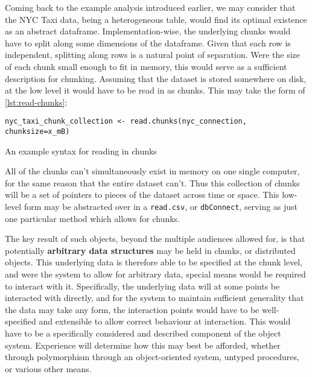 Coming back to the example analysis introduced earlier, we may consider
that the NYC Taxi data, being a heterogeneous table, would find its
optimal existence as an abstract dataframe. Implementation-wise, the
underlying chunks would have to split along some dimensions of the
dataframe. Given that each row is independent, splitting along rows is a
natural point of separation. Were the size of each chunk small enough to
fit in memory, this would serve as a sufficient description for
chunking. Assuming that the dataset is stored somewhere on disk, at the
low level it would have to be read in as chunks. This may take the form of
\cref{lst:read-chunks}:

\begin{listing}
    \begin{verbatim}
nyc_taxi_chunk_collection <- read.chunks(nyc_connection, chunksize=x_mB)
    \end{verbatim}
    \caption{An example syntax for reading in chunks}
    \label{lst:read-chunks}
\end{listing}

All of the chunks can't simultaneously exist in memory on one single
computer, for the same reason that the entire dataset can't. Thus this
collection of chunks will be a set of pointers to pieces of the dataset
across time or space. This low-level form may be abstracted over in a
\texttt{read.csv}, or \texttt{dbConnect}, serving as just one particular
method which allows for chunks.

The key result of such objects, beyond the multiple audiences allowed
for, is that potentially \textbf{arbitrary data structures} may be held
in chunks, or distributed objects. This underlying data is therefore
able to be specified at the chunk level, and were the system to allow
for arbitrary data, special means would be required to interact with it.
Specifically, the underlying data will at some points be interacted with
directly, and for the system to maintain sufficient generality that the
data may take any form, the interaction points would have to be
well-specified and extensible to allow correct behaviour at interaction.
This would have to be a specifically considered and described component
of the object system. Experience will determine how this may best be
afforded, whether through polymorphism through an object-oriented
system, untyped procedures, or various other means.

